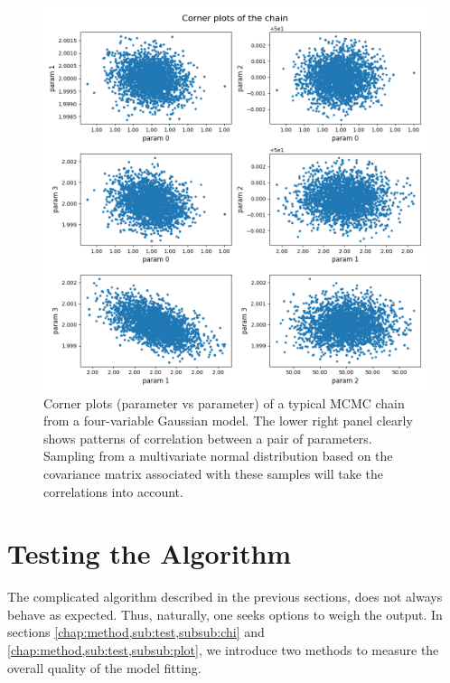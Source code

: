 \documentclass[12pt, TexShade, letterpaper]{report}
\begin{document}
\begin{figure}[h!]
\centering
\includegraphics[scale =0.6]{corner_plot_chain.png}
\caption[Corner plots of an MCMC chain]{Corner plots (parameter vs parameter) of a typical MCMC chain from a four-variable Gaussian model. The lower right panel clearly shows patterns of correlation between a pair of parameters. Sampling from a multivariate normal distribution based on the covariance matrix associated with these samples will take the correlations into account.}
\label{fig:corner_plots}
\end{figure}

\section{Testing the Algorithm}
\label{chap:method,sub:test}
The complicated algorithm described in the previous sections, does not always behave as expected. Thus, naturally, one seeks options to weigh the output. In sections \ref{chap:method,sub:test,subsub:chi} and \ref{chap:method,sub:test,subsub:plot}, we introduce two methods to measure the overall quality of the model fitting.\par
\end{document}
